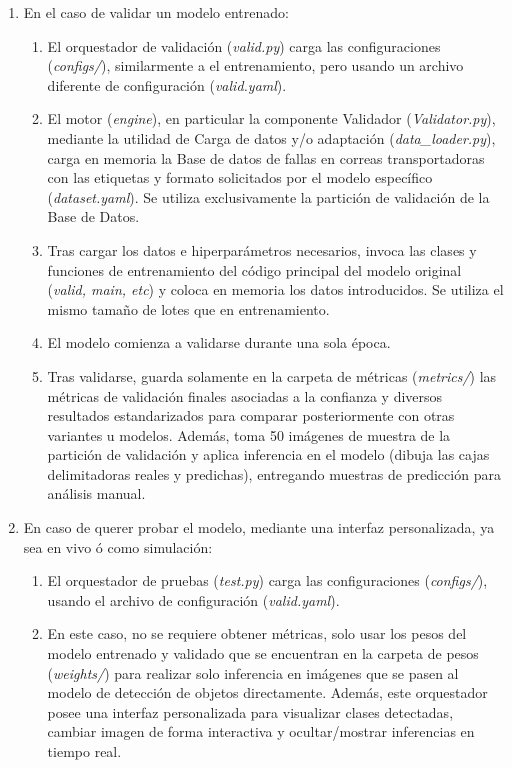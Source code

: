 \begin{enumerate}
    \item En el caso de validar un modelo entrenado:
    \begin{enumerate}
        \item El orquestador de validación (\textit{valid.py}) carga las configuraciones (\textit{configs/}), similarmente a el entrenamiento, pero usando un archivo diferente de configuración (\textit{valid.yaml}).
        \item El motor (\textit{engine}), en particular la componente Validador (\textit{Validator.py}), mediante la utilidad de Carga de datos y/o adaptación (\textit{data\_loader.py}), carga en memoria la Base de datos de fallas en correas transportadoras con las etiquetas y formato solicitados por el modelo específico (\textit{dataset.yaml}). Se utiliza exclusivamente la partición de validación de la Base de Datos.

        \item Tras cargar los datos e hiperparámetros necesarios, invoca las clases y funciones de entrenamiento del código principal del modelo original (\textit{valid, main, etc}) y coloca en memoria los datos introducidos. Se utiliza el mismo tamaño de lotes que en entrenamiento.
        \item El modelo comienza a validarse durante una sola época. 
        \item Tras validarse, guarda solamente en la carpeta de métricas (\textit{metrics/}) las métricas de validación finales asociadas a la confianza y diversos resultados estandarizados para comparar posteriormente con otras variantes u modelos. Además, toma 50 imágenes de muestra de la partición de validación y aplica inferencia en el modelo (dibuja las cajas delimitadoras reales y predichas), entregando muestras de predicción para análisis manual.
    \end{enumerate}

    \item En caso de querer probar el modelo, mediante una interfaz personalizada, ya sea en vivo ó como simulación:
    \begin{enumerate}
        \item El orquestador de pruebas (\textit{test.py}) carga las configuraciones (\textit{configs/}), usando el archivo de configuración (\textit{valid.yaml}). 
        \item En este caso, no se requiere obtener métricas, solo usar los pesos del modelo entrenado y validado que se encuentran en la carpeta de pesos (\textit{weights/}) para realizar solo inferencia en imágenes que se pasen al modelo de detección de objetos directamente. Además, este orquestador posee una interfaz personalizada para visualizar clases detectadas, cambiar imagen de forma interactiva y ocultar/mostrar inferencias en tiempo real. 
    \end{enumerate}


\end{enumerate}
